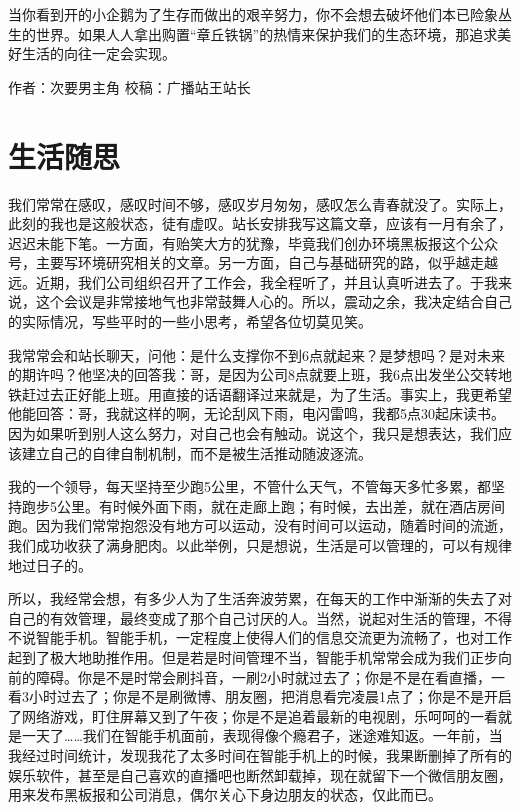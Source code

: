 \documentclass[]{book}
\begin{document}
当你看到开的小企鹅为了生存而做出的艰辛努力，你不会想去破坏他们本已险象丛生的世界。如果人人拿出购置``章丘铁锅''的热情来保护我们的生态环境，那追求美好生活的向往一定会实现。

作者：次要男主角
校稿：广播站王站长

\hypertarget{ux751fux6d3bux968fux601d}{%
\section{生活随思}\label{ux751fux6d3bux968fux601d}}

我们常常在感叹，感叹时间不够，感叹岁月匆匆，感叹怎么青春就没了。实际上，此刻的我也是这般状态，徒有虚叹。站长安排我写这篇文章，应该有一月有余了，迟迟未能下笔。一方面，有贻笑大方的犹豫，毕竟我们创办环境黑板报这个公众号，主要写环境研究相关的文章。另一方面，自己与基础研究的路，似乎越走越远。近期，我们公司组织召开了工作会，我全程听了，并且认真听进去了。于我来说，这个会议是非常接地气也非常鼓舞人心的。所以，震动之余，我决定结合自己的实际情况，写些平时的一些小思考，希望各位切莫见笑。

我常常会和站长聊天，问他：是什么支撑你不到6点就起来？是梦想吗？是对未来的期许吗？他坚决的回答我：哥，是因为公司8点就要上班，我6点出发坐公交转地铁赶过去正好能上班。用直接的话语翻译过来就是，为了生活。事实上，我更希望他能回答：哥，我就这样的啊，无论刮风下雨，电闪雷鸣，我都5点30起床读书。因为如果听到别人这么努力，对自己也会有触动。说这个，我只是想表达，我们应该建立自己的自律自制机制，而不是被生活推动随波逐流。

我的一个领导，每天坚持至少跑5公里，不管什么天气，不管每天多忙多累，都坚持跑步5公里。有时候外面下雨，就在走廊上跑；有时候，去出差，就在酒店房间跑。因为我们常常抱怨没有地方可以运动，没有时间可以运动，随着时间的流逝，我们成功收获了满身肥肉。以此举例，只是想说，生活是可以管理的，可以有规律地过日子的。

所以，我经常会想，有多少人为了生活奔波劳累，在每天的工作中渐渐的失去了对自己的有效管理，最终变成了那个自己讨厌的人。当然，说起对生活的管理，不得不说智能手机。智能手机，一定程度上使得人们的信息交流更为流畅了，也对工作起到了极大地助推作用。但是若是时间管理不当，智能手机常常会成为我们正步向前的障碍。你是不是时常会刷抖音，一刷2小时就过去了；你是不是在看直播，一看3小时过去了；你是不是刷微博、朋友圈，把消息看完凌晨1点了；你是不是开启了网络游戏，盯住屏幕又到了午夜；你是不是追着最新的电视剧，乐呵呵的一看就是一天了\ldots{}\ldots{}我们在智能手机面前，表现得像个瘾君子，迷途难知返。一年前，当我经过时间统计，发现我花了太多时间在智能手机上的时候，我果断删掉了所有的娱乐软件，甚至是自己喜欢的直播吧也断然卸载掉，现在就留下一个微信朋友圈，用来发布黑板报和公司消息，偶尔关心下身边朋友的状态，仅此而已。
\end{document}

